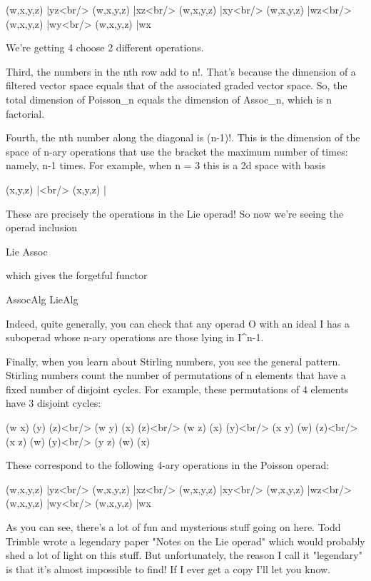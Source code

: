 (w,x,y,z) |yz<br/>
(w,x,y,z) |xz<br/>
(w,x,y,z) |xy<br/>
(w,x,y,z) |wz<br/>
(w,x,y,z) |wy<br/>
(w,x,y,z) |wx

We're getting 4 choose 2 different operations.

Third, the numbers in the nth row add to n!.  That's because the
dimension of a filtered vector space equals that of the associated
graded vector space.  So, the total dimension of Poisson_{n}
equals the dimension of Assoc_{n}, which is n factorial.

Fourth, the nth number along the diagonal is (n-1)!.  This is the
dimension of the space of n-ary operations that use the bracket the
maximum number of times: namely, n-1 times.  For example, when n = 3
this is a 2d space with basis

(x,y,z) |<br/>
(x,y,z) |

These are precisely the operations in the Lie operad!  So now we're
seeing the operad inclusion

Lie \to  Assoc

which gives the forgetful functor

AssocAlg \to  LieAlg

Indeed, quite generally, you can check that any operad O with an ideal
I has a suboperad whose n-ary operations are those lying in I^{n-1}. 

Finally, when you learn about Stirling numbers, you see the general
pattern.  Stirling numbers count the number of permutations of n
elements that have a fixed number of disjoint cycles.  For example,
these permutations of 4 elements have 3 disjoint cycles:

(w x) (y) (z)<br/>
(w y) (x) (z)<br/>
(w z) (x) (y)<br/>
(x y) (w) (z)<br/>
(x z) (w) (y)<br/>
(y z) (w) (x)

These correspond to the following 4-ary operations in the Poisson
operad:

(w,x,y,z) |yz<br/>
(w,x,y,z) |xz<br/>
(w,x,y,z) |xy<br/>
(w,x,y,z) |wz<br/>
(w,x,y,z) |wy<br/>
(w,x,y,z) |wx

As you can see, there's a lot of fun and mysterious stuff going on
here.  Todd Trimble wrote a legendary paper "Notes on the Lie
operad" which would probably shed a lot of light on this stuff.
But unfortunately, the reason I call it "legendary" is that
it's almost impossible to find!  If I ever get a copy I'll let you
know.

